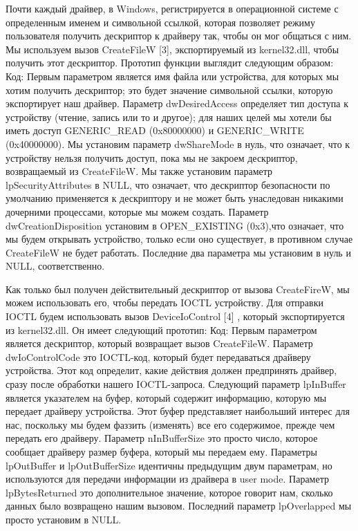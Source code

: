 \documentclass[12pt]{book}
\begin{document}
Почти каждый драйвер, в Windows, регистрируется в операционной системе с определенным именем и символьной ссылкой, которая позволяет режиму пользователя получить дескриптор к драйверу так, чтобы он мог общаться с ним. Мы используем вызов CreateFileW [3], экспортируемый из kernel32.dll, чтобы получить этот дескриптор. Прототип функции выглядит следующим образом:
Код:
Первым параметром является имя файла или устройства, для которых мы хотим получить дескриптор; это будет значение символьной ссылки, которую экспортирует наш драйвер. Параметр dwDesiredAccess определяет тип доступа к устройству (чтение, запись или то и другое); для наших целей мы хотели бы иметь доступ GENERIC\_READ (0x80000000) и GENERIC\_WRITE (0x40000000). Мы установим параметр dwShareMode в нуль, что означает, что к устройству нельзя получить доступ, пока мы не закроем дескриптор, возвращаемый из CreateFileW. Мы также установим параметр lpSecurityAttributes в NULL, что означает, что дескриптор безопасности по умолчанию применяется к дескриптору и не может быть унаследован никакими дочерними процессами, которые мы можем создать. Параметр dwCreationDisposition установим в OPEN\_EXISTING (0x3),что означает, что мы будем открывать устройство, только если оно существует, в противном случае CreateFileW не будет работать. Последние два параметра мы установим в нуль и NULL, соответственно. 

Как только был получен действительный дескриптор от вызова CreateFireW, мы можем использовать его, чтобы передать IOCTL устройству. Для отправки IOCTL будем использовать вызов DeviceIoControl [4] , который экспортируется из kernel32.dll. Он имеет следующий прототип:
Код:
Первым параметром является дескриптор, который возвращает вызов CreateFileW. Параметр dwIoControlCode это IOCTL-код, который будет передаваться драйверу устройства. Этот код определит, какие действия должен предпринять драйвер, сразу после обработки нашего IOCTL-запроса. Следующий параметр lpInBuffer является указателем на буфер, который содержит информацию, которую мы передает драйверу устройства. Этот буфер представляет наибольший интерес для нас, поскольку мы будем фаззить (изменять) все его содержимое, прежде чем передать его драйверу. Параметр nInBufferSize это просто число, которое сообщает драйверу размер буфера, который мы передаем ему. Параметры lpOutBuffer и lpOutBufferSize идентичны предыдущим двум параметрам, но используются для передачи информации из драйвера в user mode. Параметр lpBytesReturned это дополнительное значение, которое говорит нам, сколько данных было возвращено нашим вызовом. Последний параметр lpOverlapped мы просто установим в NULL.
\end{document}
